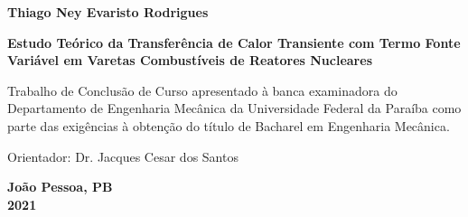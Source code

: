 \begin{titlepage}
    \begin{center}
        {\large
        \textbf{Thiago Ney Evaristo Rodrigues \\}}
        
        \vspace{5cm}
        
        {\Large
        \textbf{Estudo Teórico da Transferência de Calor Transiente com Termo Fonte Variável em Varetas Combustíveis de Reatores Nucleares}}
    \end{center}
        
    \vspace{5cm}
        
    {\large
    Trabalho de Conclusão de Curso apresentado à banca examinadora do Departamento de Engenharia Mecânica da Universidade Federal da Paraíba como parte das exigências à obtenção do título de Bacharel em Engenharia Mecânica.}
        
    \vspace{1cm}
        
    {\large
    Orientador: Dr. Jacques Cesar dos Santos}
        
    \begin{center}     
        \vspace{5cm}
        {\large
        \textbf{João Pessoa, PB \\
        2021 \\}}
    \end{center}
\end{titlepage}